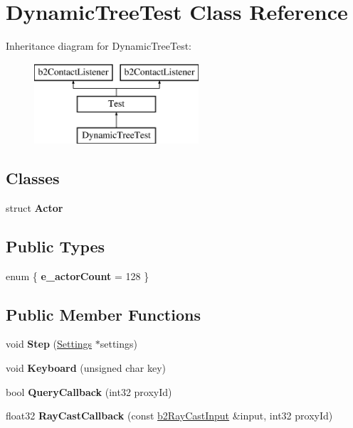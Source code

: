 \hypertarget{class_dynamic_tree_test}{\section{Dynamic\-Tree\-Test Class Reference}
\label{class_dynamic_tree_test}
}
Inheritance diagram for Dynamic\-Tree\-Test\-:\begin{figure}[H]
\begin{center}
\leavevmode
\includegraphics[height=3.000000cm]{class_dynamic_tree_test}
\end{center}
\end{figure}
\subsection*{Classes}
\begin{DoxyCompactItemize}
\item 
struct {\bfseries Actor}
\end{DoxyCompactItemize}
\subsection*{Public Types}
\begin{DoxyCompactItemize}
\item 
enum \{ {\bfseries e\-\_\-actor\-Count} =  128
 \}
\end{DoxyCompactItemize}
\subsection*{Public Member Functions}
\begin{DoxyCompactItemize}
\item 
\hypertarget{class_dynamic_tree_test_a6e004e3778c092fa43df04af8d1bb90f}{void {\bfseries Step} (\hyperlink{struct_settings}{Settings} $\ast$settings)}\label{class_dynamic_tree_test_a6e004e3778c092fa43df04af8d1bb90f}

\item 
\hypertarget{class_dynamic_tree_test_a57a4ee6a08291939bc29eb253d1a89f1}{void {\bfseries Keyboard} (unsigned char key)}\label{class_dynamic_tree_test_a57a4ee6a08291939bc29eb253d1a89f1}

\item 
\hypertarget{class_dynamic_tree_test_ad35ebc55210794faf51535f9f0ae4eb2}{bool {\bfseries Query\-Callback} (int32 proxy\-Id)}\label{class_dynamic_tree_test_ad35ebc55210794faf51535f9f0ae4eb2}

\item 
\hypertarget{class_dynamic_tree_test_a2e6975709939fb8e7c46bb2a58489e96}{float32 {\bfseries Ray\-Cast\-Callback} (const \hyperlink{structb2_ray_cast_input}{b2\-Ray\-Cast\-Input} \&input, int32 proxy\-Id)}\label{class_dynamic_tree_test_a2e6975709939fb8e7c46bb2a58489e96}

\end{DoxyCompactItemize}
